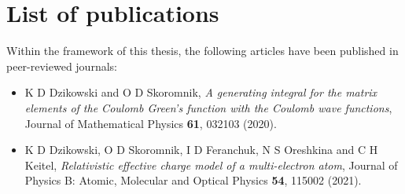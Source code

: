 \chapter*{List of publications}

Within the framework of this thesis, the following articles have been published
in peer-reviewed journals:
\begin{itemize}
    \item  K D Dzikowski and O D Skoromnik, \textit{A generating integral for the matrix elements of the Coulomb Green's function with the Coulomb wave functions}, Journal of Mathematical Physics \textbf{61}, 032103 (2020).
    \item  K D Dzikowski, O D Skoromnik, I D Feranchuk, N S Oreshkina and C H Keitel, \textit{Relativistic effective charge model of a multi-electron atom}, Journal of Physics B: Atomic, Molecular and Optical Physics \textbf{54}, 115002 (2021).
\end{itemize}